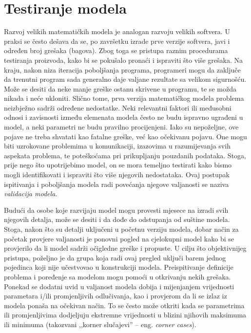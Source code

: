 \documentclass[a4paper, utf8, 11pt, colorlinks]{book}
\theoremstyle{definition}
\begin{document}


\section{Testiranje modela}
 
Razvoj velikih matematičkih modela je analogan razvoju velikih softvera. U praksi se često dešava da se, po završetku izrade prve verzije softvera, javi i određen broj grešaka (bagova). Zbog toga se pristupa raznim procedurama testiranja proizvoda, kako bi se pokušalo pronaći i
ispraviti što više grešaka. Na kraju, nakon niza iteracija poboljšanja programa, programeri mogu da zaključe da trenutni program sada generalno daje  valjane rezultate sa velikom sigurnošću. Može se desiti da neke manje greške ostanu skrivene u programu, te se možda   nikada i neće ukloniti. Slično tome, prva verzija matematičkog modela problema neizbježno sadrži određene
nedostatke. Neki relevantni faktori ili međusobni odnosi i zavisnosti između elemenata modela često ne budu  ispravno ugrađeni
u model, a neki parametri ne budu pravilno procijenjeni. Iako su nepoželjne, ove pojave ne treba shvatati kao fatalne greške, već kao očekivanu pojavu. One mogu biti uzrokovane problemima u komunikaciji, izazovima u razumijevanja svih aspekata problema, te poteškoćama pri prikupljanju pouzdanih podataka. Stoga, prije nego što upotrijebimo model, on se mora  temeljno testirati kako bismo mogli  identifikovati 
i ispraviti što više njegovih nedostataka.  Ovaj postupak ispitivanja i poboljšanja modela radi povećanja njegove valjanosti se naziva \emph{validacija modela}. 

Budući da osobe koje razvijaju model mogu provesti mjesece na izradi svih njegovih detalja, može se desiti i da dođe do odstupanja od suštine modela. Stoga, nakon što su detalji uključeni u 
početnu verziju modela, dobar način za početak provjere valjanosti je ponovni pogled na cjelokupni model kako bi se provjerilo da li model sadrži  očigledne greške i propuste. U cilju što objektivnijeg pristupa, poželjno je da grupa koja radi ovaj pregled uključi barem jednog pojedinca koji nije učestvovao u konstrukciji modela. Preispitivanje definicije
problema i poređenje sa modelom mogu pomoći u otkrivanju nekih  grešaka.  Ponekad se  dodatni uvid u valjanost modela dobija i 
mijenjanjem vrijednosti parametara i/ili promjenljivih odlučivanja, kao i provjerom da li se  izlaz iz modela ponaša na očekivan način. To se često može otkriti kada se parametrima ili promjenljivima dodjeljuju ekstremne vrijednosti u blizini njihovih maksimuma ili minimuma (takozvani ,,korner slučajevi'' -- eng. \textit{corner cases}). 
\end{document}
